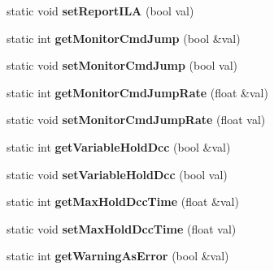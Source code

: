 \begin{DoxyCompactItemize}
\item 
\hypertarget{classRobotConf_a5689c8de4e8941541c3d91a0d69811a1}{static void {\bfseries set\-Report\-I\-L\-A} (bool val)}\label{classRobotConf_a5689c8de4e8941541c3d91a0d69811a1}

\item 
\hypertarget{classRobotConf_ab60deef9101f1d0c03f061f6d3c8aa85}{static int {\bfseries get\-Monitor\-Cmd\-Jump} (bool \&val)}\label{classRobotConf_ab60deef9101f1d0c03f061f6d3c8aa85}

\item 
\hypertarget{classRobotConf_a8415ab2d137b49f004aed16bd031f93d}{static void {\bfseries set\-Monitor\-Cmd\-Jump} (bool val)}\label{classRobotConf_a8415ab2d137b49f004aed16bd031f93d}

\item 
\hypertarget{classRobotConf_a20d7ca0e2401f6c839979a271432997f}{static int {\bfseries get\-Monitor\-Cmd\-Jump\-Rate} (float \&val)}\label{classRobotConf_a20d7ca0e2401f6c839979a271432997f}

\item 
\hypertarget{classRobotConf_a783510aa4bea3571c3bfc58f261a1cf3}{static void {\bfseries set\-Monitor\-Cmd\-Jump\-Rate} (float val)}\label{classRobotConf_a783510aa4bea3571c3bfc58f261a1cf3}

\item 
\hypertarget{classRobotConf_ac8b41d9490fe1264b22f6eab284b031a}{static int {\bfseries get\-Variable\-Hold\-Dcc} (bool \&val)}\label{classRobotConf_ac8b41d9490fe1264b22f6eab284b031a}

\item 
\hypertarget{classRobotConf_a8b3a14c5d30e670563eadef382e923d9}{static void {\bfseries set\-Variable\-Hold\-Dcc} (bool val)}\label{classRobotConf_a8b3a14c5d30e670563eadef382e923d9}

\item 
\hypertarget{classRobotConf_a3e8b7676bc7eec823b0023c0b97a22e1}{static int {\bfseries get\-Max\-Hold\-Dcc\-Time} (float \&val)}\label{classRobotConf_a3e8b7676bc7eec823b0023c0b97a22e1}

\item 
\hypertarget{classRobotConf_acc4630c55f8c8923ba00a94e14a15748}{static void {\bfseries set\-Max\-Hold\-Dcc\-Time} (float val)}\label{classRobotConf_acc4630c55f8c8923ba00a94e14a15748}

\item 
\hypertarget{classRobotConf_ae872d368db9108ef4b614340cf5f2304}{static int {\bfseries get\-Warning\-As\-Error} (bool \&val)}\label{classRobotConf_ae872d368db9108ef4b614340cf5f2304}


\end{DoxyCompactItemize}
